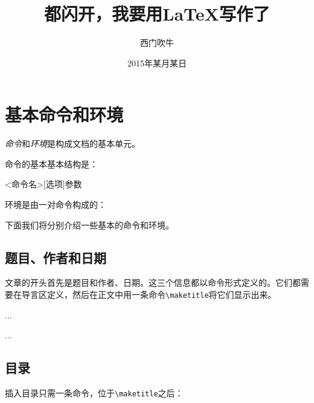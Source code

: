 
\section{基本命令和环境}

\emph{命令}和\emph{环境}是构成文档的基本单元。

命令的基本基本结构是：

\begin{code}
  <命令名>[选项]{参数}
\end{code}

环境是由一对命令构成的：
\begin{code}
 \begin{环境名}[选项] 
 \end{环境名}
\end{code}

下面我们将分别介绍一些基本的命令和环境。

\subsection{题目、作者和日期}

文章的开头首先是题目和作者、日期。这三个信息都以命令形式定义的。它们都需
要在导言区定义，然后在正文中用一条命令\verb!\maketitle!将它们显示出来。

\begin{code}
  ...
  \title{都闪开，我要用\LaTeX{}写作了}
  \author{西门吹牛}
  \date{2015年某月某日}
  ...
  
    \maketitle %
  
\end{code}

\subsection{目录}

插入目录只需一条命令，位于\verb!\maketitle!之后：

\begin{code}
  \tableofcontents
\end{code}

